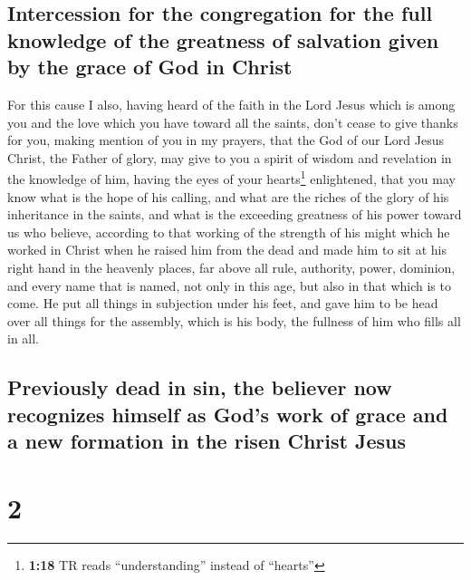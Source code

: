 \hypertarget{intercession-for-the-congregation-for-the-full-knowledge-of-the-greatness-of-salvation-given-by-the-grace-of-god-in-christ}{%
\subsection{Intercession for the congregation for the full knowledge of
the greatness of salvation given by the grace of God in
Christ}\label{intercession-for-the-congregation-for-the-full-knowledge-of-the-greatness-of-salvation-given-by-the-grace-of-god-in-christ}}

 For this cause I also, having heard of the faith in the
Lord Jesus which is among you and the love which you have toward all the
saints,  don't cease to give thanks for you, making
mention of you in my prayers,  that the God of our Lord
Jesus Christ, the Father of glory, may give to you a spirit of wisdom
and revelation in the knowledge of him,  having the eyes
of your hearts\footnote{\textbf{1:18} TR reads ``understanding'' instead
  of ``hearts''} enlightened, that you may know what is the hope of his
calling, and what are the riches of the glory of his inheritance in the
saints,  and what is the exceeding greatness of his power
toward us who believe, according to that working of the strength of his
might  which he worked in Christ when he raised him from
the dead and made him to sit at his right hand in the heavenly places,
 far above all rule, authority, power, dominion, and
every name that is named, not only in this age, but also in that which
is to come.  He put all things in subjection under his
feet, and gave him to be head over all things for the assembly,
 which is his body, the fullness of him who fills all in
all.

\hypertarget{previously-dead-in-sin-the-believer-now-recognizes-himself-as-gods-work-of-grace-and-a-new-formation-in-the-risen-christ-jesus}{%
\subsection{Previously dead in sin, the believer now recognizes himself
as God's work of grace and a new formation in the risen Christ
Jesus}\label{previously-dead-in-sin-the-believer-now-recognizes-himself-as-gods-work-of-grace-and-a-new-formation-in-the-risen-christ-jesus}}

\hypertarget{section-1}{%
\section{2}\label{section-1}}

